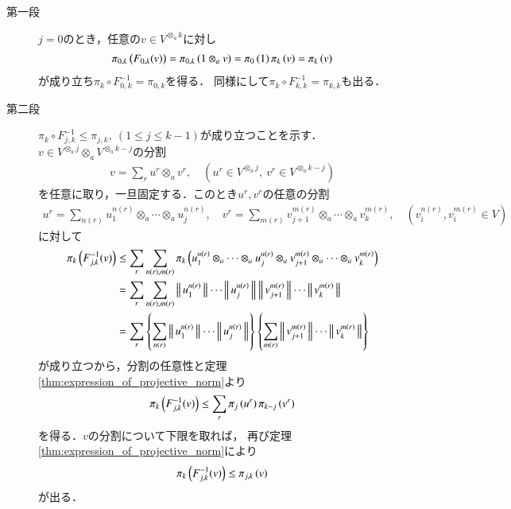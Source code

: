 	\begin{prf}\mbox{}
		\begin{description}
			\item[第一段]
				$j=0$のとき，任意の$v \in V^{\otimes_a k}$に対し
				\begin{align}
					\projectivenorm{F_{0,k}(v)}{0,k}
					= \projectivenorm{1 \otimes_a v}{0,k}
					= \projectivenorm{1}{0}\projectivenorm{v}{k}
					= \projectivenorm{v}{k}
				\end{align}
				が成り立ち$\pi_k \circ F^{-1}_{0,k} = \pi_{0,k}$を得る．
				同様にして$\pi_k \circ F^{-1}_{k,k} = \pi_{k,k}$も出る．
				
			\item[第二段]
				$\pi_k \circ F^{-1}_{j,k} \leq \pi_{j,k},\ (1 \leq j \leq k-1)$が成り立つことを示す．
				$v \in V^{\otimes_a j} \otimes_a V^{\otimes_a k-j}$の分割
				\begin{align}
					v = \sum_{r} u^r \otimes_a v^r,
					\quad (u^r \in V^{\otimes_a j},\ v^r \in V^{\otimes_a k-j})
				\end{align}
				を任意に取り，一旦固定する．このとき$u^r,v^r$の任意の分割
				\begin{align}
					u^r = \sum_{n(r)} u^{n(r)}_1 \otimes_a \cdots \otimes_a u^{n(r)}_j, 
					\quad v^r = \sum_{m(r)} v^{m(r)}_{j+1} \otimes_a \cdots \otimes_a v^{m(r)}_{k},
					\quad (v^{n(r)}_i,v^{m(r)}_i \in V)
				\end{align}
				に対して
				\begin{align}
					\projectivenorm{F^{-1}_{j,k}(v)}{k}
					&\leq \sum_{r} \sum_{n(r),m(r)} \projectivenorm{u^{n(r)}_1 \otimes_a \cdots \otimes_a u^{n(r)}_j \otimes_a v^{m(r)}_{j+1} \otimes_a \cdots \otimes_a v^{m(r)}_{k}}{k} \\
					&= \sum_{r} \sum_{n(r),m(r)} \Norm{u^{n(r)}_1}{} \cdots \Norm{u^{n(r)}_j}{} \Norm{v^{m(r)}_{j+1}}{} \cdots \Norm{v^{m(r)}_k}{} \\
					&= \sum_{r} \left\{ \sum_{n(r)} \Norm{u^{n(r)}_1}{} \cdots \Norm{u^{n(r)}_j}{} \right\} \left\{ \sum_{m(r)} \Norm{v^{m(r)}_{j+1}}{} \cdots \Norm{v^{m(r)}_k}{} \right\} 
				\end{align}
				が成り立つから，分割の任意性と定理\ref{thm:expression_of_projective_norm}より
				\begin{align}
					\projectivenorm{F^{-1}_{j,k}(v)}{k} 
					\leq \sum_r \projectivenorm{u^r}{j}\projectivenorm{v^r}{k-j}
				\end{align}
				を得る．$v$の分割について下限を取れば，
				再び定理\ref{thm:expression_of_projective_norm}により
				\begin{align}
					\projectivenorm{F^{-1}_{j,k}(v)}{k} \leq \projectivenorm{v}{j,k}
				\end{align}
				が出る．
			

\end{description}
\end{prf}
